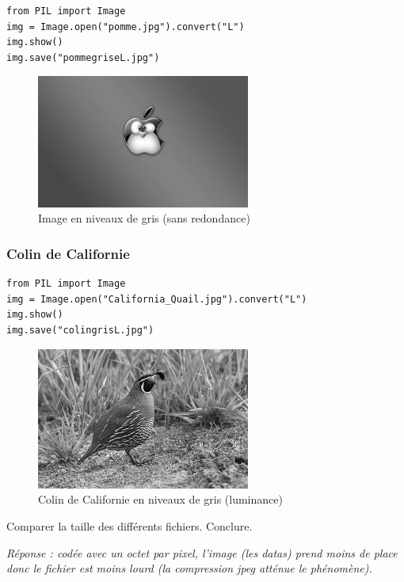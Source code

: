 \documentclass[11pt]{article}
\begin{document}
\begin{verbatim}
from PIL import Image
img = Image.open("pomme.jpg").convert("L")
img.show()
img.save("pommegriseL.jpg")
\end{verbatim}


\begin{figure}[htbp]
\centering
\includegraphics[width=7cm]{pommegriseL.jpg}
\caption{Image en niveaux de gris (sans redondance)}
\end{figure}


\subsubsection{Colin de Californie}
\label{sec:org971dd3f}

\begin{verbatim}
from PIL import Image
img = Image.open("California_Quail.jpg").convert("L")
img.show()
img.save("colingrisL.jpg")
\end{verbatim}


\begin{figure}[htbp]
\centering
\includegraphics[width=7cm]{colingrisL.jpg}
\caption{Colin de Californie en niveaux de gris (luminance)}
\end{figure}

Comparer la taille des différents fichiers. Conclure.



\emph{Réponse : codée avec un octet par pixel, l'image (les datas) prend moins de place donc le fichier est moins lourd (la compression jpeg atténue le phénomène).}
\end{document}
